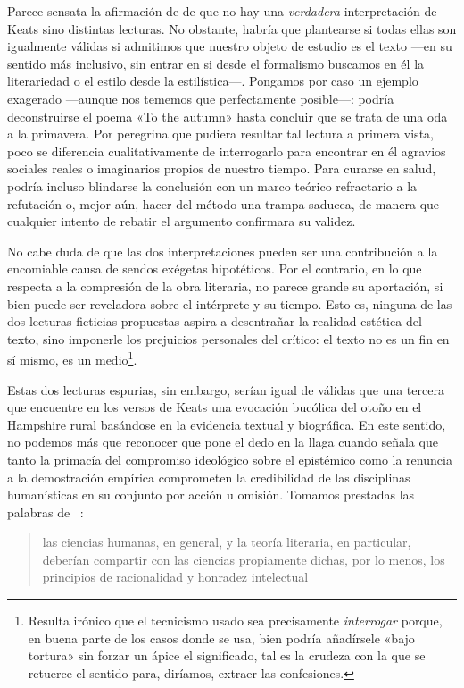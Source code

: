 Parece sensata la afirmación de \citeauthor{cameron2011} de que no hay una \textit{verdadera} interpretación de Keats sino distintas lecturas. No obstante, habría que plantearse si todas ellas son igualmente válidas si admitimos que nuestro objeto de estudio es el texto —en su sentido más inclusivo, sin entrar en si desde el formalismo buscamos en él la literariedad o el estilo desde la estilística—. Pongamos por caso un ejemplo exagerado  —aunque nos tememos que perfectamente posible—: podría deconstruirse el poema «To the autumn» hasta concluir que se trata de una oda a la primavera. Por peregrina que pudiera resultar tal lectura a primera vista, poco se diferencia cualitativamente de interrogarlo  para encontrar en él agravios sociales reales o imaginarios propios de nuestro tiempo. Para curarse en salud, podría incluso blindarse la conclusión con un marco teórico refractario a la refutación o, mejor aún, hacer del método una trampa saducea, de manera que cualquier intento de rebatir el argumento confirmara su validez.

No cabe duda de que las dos interpretaciones pueden ser una contribución a la encomiable causa de sendos exégetas hipotéticos. Por el contrario, en lo que respecta a la compresión de la obra literaria, no parece grande su aportación, si bien puede ser reveladora sobre el intérprete y su tiempo. Esto es, ninguna de las dos lecturas ficticias propuestas aspira a desentrañar la realidad estética del texto, sino imponerle los prejuicios personales del crítico: el texto no es un fin en sí mismo, es un medio\footnote{Resulta irónico que el tecnicismo usado sea precisamente \textit{interrogar} porque, en buena parte de los casos donde se usa, bien podría añadírsele «bajo tortura» sin forzar un ápice el significado, tal es la crudeza con la que se retuerce el sentido para, diríamos, extraer las confesiones.}.

Estas dos lecturas espurias, sin embargo, serían igual de válidas que una tercera que encuentre en los versos de Keats una evocación bucólica del otoño en el Hampshire rural basándose en la evidencia textual y biográfica. En este sentido, no podemos más que reconocer que \citeauthor{gottschall2008} pone el dedo en la llaga cuando señala que tanto la primacía del compromiso ideológico sobre el epistémico como la renuncia a la demostración empírica comprometen la credibilidad de las disciplinas humanísticas en su conjunto por acción u omisión. Tomamos prestadas las palabras de \citeauthor{garcia2020}~\parencite*[23]{garcia2020}: \blockquote{las ciencias humanas, en general, y la teoría literaria, en particular, deberían compartir con las ciencias propiamente dichas, por lo menos, los principios de racionalidad y honradez intelectual}.

